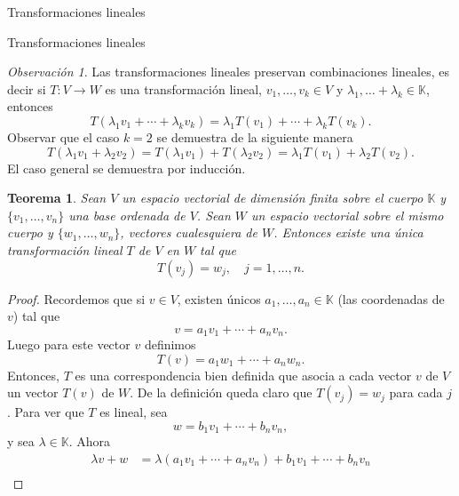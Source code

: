 \documentclass[a4paper,12pt,twoside,spanish,reqno]{amsbook}
\numberwithin{equation}{section}
\newtheorem{teorema}{Teorema}[section]
\theoremstyle{definition}
\theoremstyle{remark}
\newtheorem*{obs*}{Observaci\'on}
\newcommand{\K}{\mathbb K}
\begin{document}
\begin{chapter}{Transformaciones lineales}
\begin{section}{Transformaciones lineales}
        \begin{obs*}
            Las transformaciones lineales preservan  combinaciones lineales, es decir si $T:V \to W$ es una transformación lineal, $ v_1,\ldots,v_k \in V$ y $\lambda_1, \ldots+ \lambda_k \in \K$,  entonces
            $$
            T(\lambda_1 v_1 + \cdots+ \lambda_k v_k) = \lambda_1 T(v_1) + \cdots+ \lambda_k T(v_k).
            $$
            Observar que el caso $k=2$ se demuestra de la siguiente manera
            $$
            T(\lambda_1 v_1 +  \lambda_2 v_2) =T(\lambda_1 v_1) + T(\lambda_2 v_2) =\lambda_1 T(v_1) + \lambda_2T( v_2).
            $$
            El caso general se demuestra por inducción. 
        
        \end{obs*}
        
        
        \begin{teorema}\label{th-tl-definida-en-base}
            Sean $V$ un espacio vectorial de dimensión finita sobre el cuerpo $\K$ y $\{v_1,\ldots,v_n\}$  una base ordenada de $V$. Sean $W$ un espacio vectorial sobre el mismo cuerpo y $\{w_1,\ldots,w_n\}$, vectores cualesquiera de $W$. Entonces existe una única transformación  lineal $T$ de $V$ en $W$ tal que
            \begin{equation*}
            T(v_j) = w_j, \quad j=1,\ldots,n.
            \end{equation*}
        \end{teorema}
            \begin{proof}
                Recordemos que si $v \in V$,  existen únicos $a_1,\ldots,a_n \in \K$ (las coordenadas de $v$) tal que $$v = a_1v_1 + \cdots+a_n v_n.$$  Luego para este vector $v$  definimos
                \begin{equation*}
                    T(v) = a_1w_1 + \cdots+a_n w_n.
                \end{equation*}
                Entonces, $T$ es una correspondencia bien definida que asocia a cada vector $v$ 
                de $V$ un vector $T(v)$ de $W$. De la definición queda claro que $T(v_j) = w_j$ para cada $j$. Para ver que $T$ es lineal, sea
                \begin{equation*}
                    w = b_1v_1 + \cdots+b_n v_n,
                \end{equation*}
                y sea  $\lambda \in \K$. Ahora
                \begin{align*}
                    \lambda v+w &= \lambda(a_1v_1 + \cdots+a_n v_n) + b_1v_1 + \cdots+b_n v_n \\

\end{align*}
\end{proof}
\end{section}
\end{chapter}
\end{document}
